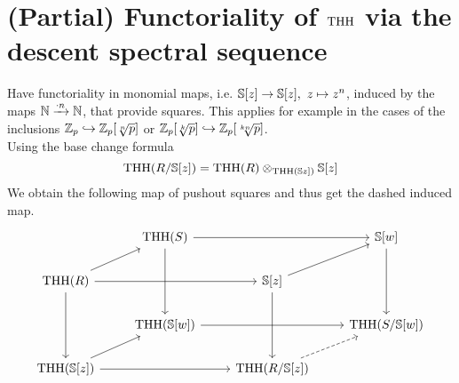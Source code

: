 \section{(Partial) Functoriality of $\THH$ via the descent spectral sequence}
Have functoriality in monomial maps, i.e. $\S[z]\to \S[z],\  z\mapsto z^n$, induced by the maps $\N\xrightarrow{\cdot n} \N$, that provide squares. This applies for example in the cases of the inclusions $\Z_p\hookrightarrow \Z_p[\sqrt[n]{p}]$ or $\Z_p[\sqrt[k]{p}]\hookrightarrow \Z_p[\sqrt[kn]{p}]$. \\
Using the base change formula 
\begin{equation*}
    \THH(R/\S[z])=\THH(R)\otimes_{\THH(\S{z]})}\S[z]
\end{equation*}
We obtain the following map of pushout squares and thus get the dashed induced map.
\[\begin{tikzcd}
	& {\THH(S)} && {\S[w]} \\
	{\THH(R)} && {\S[z]} \\
	& {\THH(\S[w])} && {\THH(S/\S[w])} \\
	{\THH(\S[z])} && {\THH(R/\S[z])}
	\arrow[from=4-1, to=4-3]
	\arrow[from=2-1, to=4-1]
	\arrow[from=2-1, to=2-3]
	\arrow[from=2-3, to=4-3]
	\arrow[from=2-1, to=1-2]
	\arrow[from=2-3, to=1-4]
	\arrow[dashed, from=4-3, to=3-4]
	\arrow[from=1-4, to=3-4]
	\arrow[from=4-1, to=3-2]
	\arrow[from=3-2, to=3-4]
	\arrow[from=1-2, to=3-2]
	\arrow[from=1-2, to=1-4]
\end{tikzcd}\]